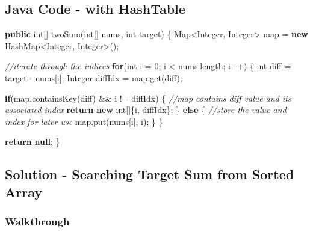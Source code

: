 \documentclass[]{book}
\newenvironment{Shaded}{\begin{snugshade}}{\end{snugshade}}
\newcommand{\BuiltInTok}[1]{#1}
\newcommand{\CommentTok}[1]{\textcolor[rgb]{0.56,0.35,0.01}{\textit{#1}}}
\newcommand{\DataTypeTok}[1]{\textcolor[rgb]{0.13,0.29,0.53}{#1}}
\newcommand{\DecValTok}[1]{\textcolor[rgb]{0.00,0.00,0.81}{#1}}
\newcommand{\FunctionTok}[1]{\textcolor[rgb]{0.00,0.00,0.00}{#1}}
\newcommand{\KeywordTok}[1]{\textcolor[rgb]{0.13,0.29,0.53}{\textbf{#1}}}
\newcommand{\NormalTok}[1]{#1}
\begin{document}
\hypertarget{java-code---with-hashtable}{%
\subsection{Java Code - with HashTable}\label{java-code---with-hashtable}}

\begin{Shaded}
\begin{Highlighting}[]
\KeywordTok{public} \DataTypeTok{int}\NormalTok{[] }\FunctionTok{twoSum}\NormalTok{(}\DataTypeTok{int}\NormalTok{[] nums, }\DataTypeTok{int}\NormalTok{ target) \{}
    \BuiltInTok{Map}\NormalTok{<}\BuiltInTok{Integer}\NormalTok{, }\BuiltInTok{Integer}\NormalTok{> map = }\KeywordTok{new} \BuiltInTok{HashMap}\NormalTok{<}\BuiltInTok{Integer}\NormalTok{, }\BuiltInTok{Integer}\NormalTok{>();}

    \CommentTok{//iterate through the indices}
    \KeywordTok{for}\NormalTok{(}\DataTypeTok{int}\NormalTok{ i = }\DecValTok{0}\NormalTok{; i < nums.}\FunctionTok{length}\NormalTok{; i++) \{}
        \DataTypeTok{int}\NormalTok{ diff = target - nums[i];}
        \BuiltInTok{Integer}\NormalTok{ diffIdx = map.}\FunctionTok{get}\NormalTok{(diff);}

        \KeywordTok{if}\NormalTok{(map.}\FunctionTok{containsKey}\NormalTok{(diff) && i != diffIdx) \{}
            \CommentTok{//map contains diff value and its associated index}
            \KeywordTok{return} \KeywordTok{new} \DataTypeTok{int}\NormalTok{[]\{i, diffIdx\};}
\NormalTok{        \} }\KeywordTok{else}\NormalTok{ \{}
            \CommentTok{//store the value and index for later use}
\NormalTok{            map.}\FunctionTok{put}\NormalTok{(nums[i], i);}
\NormalTok{        \}}
\NormalTok{    \}}

    \KeywordTok{return} \KeywordTok{null}\NormalTok{;}
\NormalTok{\}}
\end{Highlighting}
\end{Shaded}

\hypertarget{solution---searching-target-sum-from-sorted-array}{%
\subsection{Solution - Searching Target Sum from Sorted Array}\label{solution---searching-target-sum-from-sorted-array}}

\hypertarget{walkthrough-2}{%
\subsubsection{Walkthrough}\label{walkthrough-2}}
\end{document}
